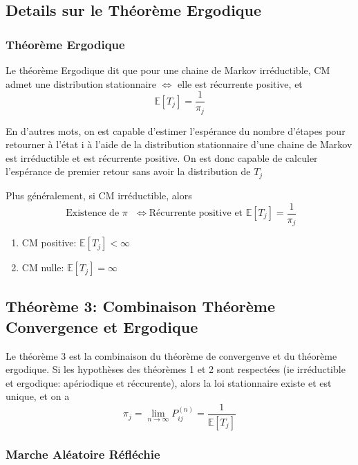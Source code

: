 \documentclass{article}
\begin{document}
\subsection{Details sur le Théorème Ergodique}

\subsubsection{Théorème Ergodique}%
\label{ssub:Théorème Ergodique}

Le théorème Ergodique dit que pour une chaine de Markov irréductible,
CM admet une distribution stationnaire $\Longleftrightarrow$ elle est
récurrente positive, et
$$ \mathbb{E} [T_j] = \frac{1}{\pi _j} $$

En d'autres mots, on est capable d'estimer l'espérance du nombre d'étapes
pour retourner à l'état i à l'aide de la distribution stationnaire d'une
chaine de Markov est irréductible et est récurrente positive. On est
donc capable de calculer l'espérance de premier retour sans avoir la
distribution de $T_j$

Plus généralement, si CM irréductible, alors
$$ \text{ Existence de $\pi$ } \Longleftrightarrow \text{Récurrente positive et } \mathbb{E} [T_j] = \frac{1}{\pi _j} $$

\begin{remark}
    \begin{enumerate}
	\item CM positive: $\mathbb{E} [T_j]<\infty$
	\item CM nulle: $\mathbb{E} [T_j]=\infty$
    \end{enumerate}
\end{remark}

\subsection{Théorème 3: Combinaison Théorème Convergence et Ergodique}

Le théorème 3 est la combinaison du théorème de convergenve et du théorème
ergodique. Si les hypothèses des théorèmes 1 et 2 sont respectées (ie
irréductible et ergodique: apériodique et réccurente), alors la
loi stationnaire existe et est unique, et on a
$$ \pi _j = \lim_{n \to \infty} P_{ij}^{(n)} = \frac{1}{\mathbb{E} [T_j]} $$

\subsubsection{Marche Aléatoire Réfléchie}%
\label{ssub:Marche Aléatoire Réfléchie}
\end{document}
